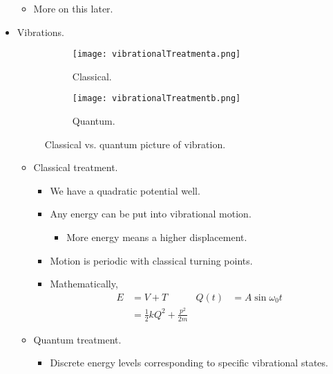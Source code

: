 \documentclass[../notes.tex]{subfiles}
\begin{document}
\begin{itemize}
    \begin{itemize}
        \item More on this later.
    \end{itemize}
    \pagebreak
    \item Vibrations.
    \begin{figure}[H]
        \centering
        \begin{subfigure}[b]{0.35\linewidth}
            \centering
            \texttt{[image: vibrationalTreatmenta.png]}
            \caption{Classical.}
            \label{fig:vibrationalTreatmenta}
        \end{subfigure}
        \begin{subfigure}[b]{0.35\linewidth}
            \centering
            \texttt{[image: vibrationalTreatmentb.png]}
            \caption{Quantum.}
            \label{fig:vibrationalTreatmentb}
        \end{subfigure}
        \caption{Classical vs. quantum picture of vibration.}
        \label{fig:vibrationalTreatment}
    \end{figure}
    \begin{itemize}
        \item Classical treatment.
        \begin{itemize}
            \item We have a quadratic potential well.
            \item Any energy can be put into vibrational motion.
            \begin{itemize}
                \item More energy means a higher displacement.
            \end{itemize}
            \item Motion is periodic with classical turning points.
            \item Mathematically,
            \begin{align*}
                E &= V+T&
                    Q(t) &= A\sin\omega_0t\\
                &= \frac{1}{2}kQ^2+\frac{p^2}{2m}
            \end{align*}
        \end{itemize}
        \item Quantum treatment.
        \begin{itemize}
            \item Discrete energy levels corresponding to specific vibrational states.

\end{itemize}
\end{itemize}
\end{itemize}
\end{document}
